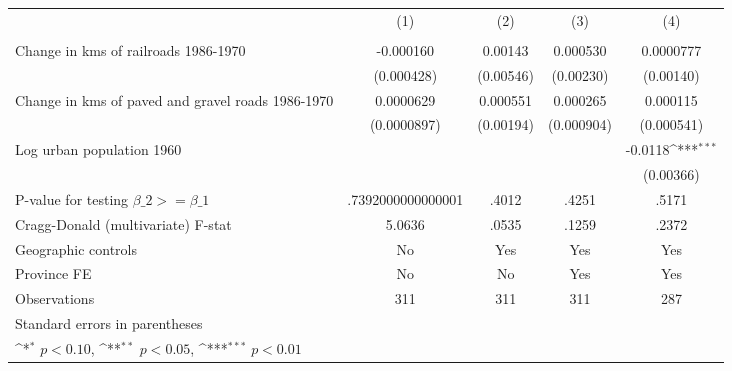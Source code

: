 {
\def\sym#1{\ifmmode^{#1}\else\(^{#1}\)\fi}
\begin{tabular}{l*{4}{c}}
\hline\hline
                &\multicolumn{1}{c}{(1)}&\multicolumn{1}{c}{(2)}&\multicolumn{1}{c}{(3)}&\multicolumn{1}{c}{(4)}\\
                &\multicolumn{1}{c}{}&\multicolumn{1}{c}{}&\multicolumn{1}{c}{}&\multicolumn{1}{c}{}\\
\hline
Change in kms of railroads 1986-1970&-0.000160         &  0.00143         & 0.000530         &0.0000777         \\
                &(0.000428)         &(0.00546)         &(0.00230)         &(0.00140)         \\
[1em]
Change in kms of paved and gravel roads 1986-1970&0.0000629         & 0.000551         & 0.000265         & 0.000115         \\
                &(0.0000897)         &(0.00194)         &(0.000904)         &(0.000541)         \\
[1em]
Log urban population 1960&                  &                  &                  &  -0.0118\sym{***}\\
                &                  &                  &                  &(0.00366)         \\
\hline
P-value for testing $\beta\_{2} >= \beta\_{1}$&.7392000000000001         &    .4012         &    .4251         &    .5171         \\
Cragg-Donald (multivariate) F-stat&   5.0636         &    .0535         &    .1259         &    .2372         \\
Geographic controls&       No         &      Yes         &      Yes         &      Yes         \\
Province FE     &       No         &       No         &      Yes         &      Yes         \\
Observations    &      311         &      311         &      311         &      287         \\
\hline\hline
\multicolumn{5}{l}{\footnotesize Standard errors in parentheses}\\
\multicolumn{5}{l}{\footnotesize \sym{*} \(p<0.10\), \sym{**} \(p<0.05\), \sym{***} \(p<0.01\)}\\
\end{tabular}
}
